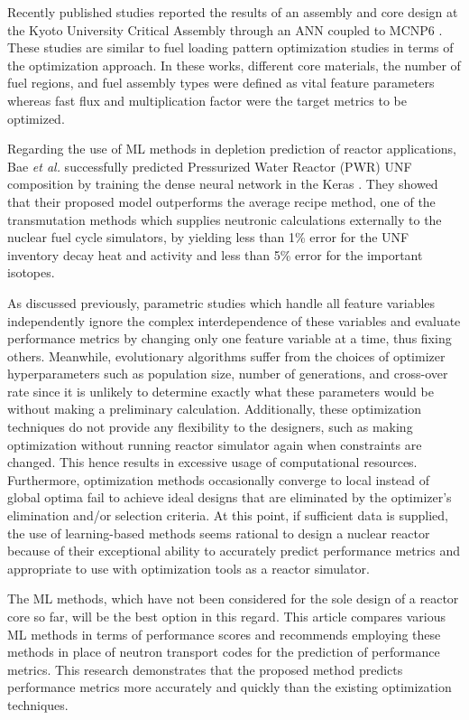     Recently published studies \cite{Kim2018, Kim2020} reported the results of an assembly and core design at the Kyoto University Critical Assembly through an \gls{ANN} coupled to MCNP6 \cite{mcnp2017}. These studies are similar to fuel loading pattern optimization studies in terms of the optimization approach. In these works, different core materials, the number of fuel regions, and fuel assembly types were defined as vital feature parameters whereas fast flux and multiplication factor were the target metrics to be optimized.

    Regarding the use of \gls{ML} methods in depletion prediction of reactor applications, Bae \emph{et al.} \cite{Bae2020} successfully predicted Pressurized Water Reactor (PWR) \gls{UNF} composition by training the dense neural network in the Keras \cite{keras2015}. They showed that their proposed model outperforms the average recipe method, one of the transmutation methods which supplies neutronic calculations externally to the nuclear fuel cycle simulators, by yielding less than 1\% error for the \gls{UNF} inventory decay heat and activity and less than 5\% error for the important isotopes.

    As discussed previously, parametric studies which handle all feature variables independently ignore the complex interdependence of these variables and evaluate performance metrics by changing only one feature variable at a time, thus fixing others. Meanwhile, evolutionary algorithms suffer from the choices of optimizer hyperparameters such as population size, number of generations, and cross-over rate since it is unlikely to determine exactly what these parameters would be without making a preliminary calculation. Additionally, these optimization techniques do not provide any flexibility to the designers, such as making optimization without running reactor simulator again when constraints are changed. This hence results in excessive usage of computational resources. Furthermore, optimization methods occasionally converge to local instead of global optima fail to achieve ideal designs that are eliminated by the optimizer's elimination and/or selection criteria. At this point, if sufficient data is supplied, the use of learning-based methods seems rational to design a nuclear reactor because of their exceptional ability to accurately predict performance metrics and appropriate to use with optimization tools as a reactor simulator.

    The \gls{ML} methods, which have not been considered for the sole design of a reactor core so far, will be the best option in this regard. This article compares various \gls{ML} methods in terms of performance scores and recommends employing these methods in place of neutron transport codes for the prediction of performance metrics. This research demonstrates that the proposed method predicts performance metrics more accurately and quickly than the existing optimization techniques.

